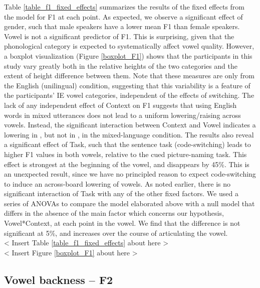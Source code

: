 \documentclass[12 pt]{article}
\newcommand{\nt}[1]{\textipa{[#1]}} %
\begin{document}
Table \ref{table_f1_fixed_effects} summarizes the results of the fixed effects from the model for F1 at each point. As expected, we observe a significant effect of gender, such that male speakers have a lower mean F1 than female speakers. Vowel is not a significant predictor of F1. This is surprising, given that the phonological category is expected to systematically affect vowel quality. However, a boxplot visualization (Figure \ref{boxplot_F1}) shows that the participants in this study vary greatly both in the relative heights of the two categories \nt{2, \ae} and the extent of height difference between them. Note that these measures are only from the English (unilingual) condition, suggesting that this variability is a feature of the participants' IE vowel categories, independent of the effects of switching. The lack of any independent effect of Context on F1 suggests that using English words in mixed utterances does not lead to a uniform lowering/raising across vowels. Instead, the significant interaction between Context and Vowel indicates a lowering in \nt{2}, but not in \nt{\ae}, in the mixed-language condition. The results also reveal a significant effect of Task, such that the sentence task (code-switching) leads to higher F1 values in both vowels, relative to the cued picture-naming task. This effect is strongest at the beginning of the vowel, and disappears by 45\%. This is an unexpected result, since we have no principled reason to expect code-switching to induce an across-board lowering of vowels. As noted earlier, there is no significant interaction of Task with any of the other fixed factors. We used a series of ANOVAs to compare the model elaborated above with a null model that differs in the absence of the main factor which concerns our hypothesis, Vowel*Context, at each point in the vowel. We find that the difference is not significant at 5\%, and increases over the course of articulating the vowel. \\

< Insert Table \ref{table_f1_fixed_effects} about here >\\

< Insert Figure \ref{boxplot_F1} about here >\\


\subsection{Vowel backness -- F2}
\end{document}
